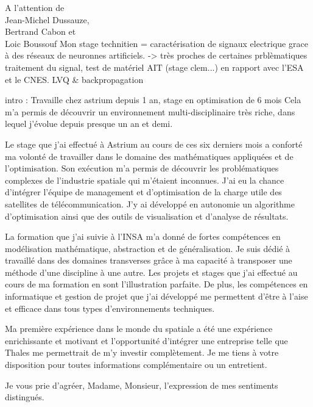 \documentclass[12pt]{lettre}
\begin{document}
\begin{letter}{A l'attention de\\Jean-Michel Dussauze,\\Bertrand Cabon et\\ Loic Boussouf}
Mon stage technitien = caractérisation de signaux electrique grace à des réseaux de neuronnes artificiels. -> très proches de certaines prblèmatiques traitement du signal, test de matériel AIT (stage clem...) en rapport avec l'ESA et le CNES. LVQ \& backpropagation


intro : Travaille chez astrium depuis 1 an, stage en optimisation de 6 mois
Cela m'a permis de découvrir un environnement multi-disciplinaire très riche, dans lequel j'évolue depuis presque un an et demi.


Le stage que j'ai effectué à Astrium au cours de ces six derniers mois a conforté ma volonté de travailler dans le domaine des mathématiques appliquées et de l'optimisation. Son exécution m'a permis de découvrir les problématiques complexes de l'industrie spatiale qui m'étaient inconnues. J'ai eu la chance d'intégrer l'équipe de management et d'optimisation de la charge utile des satellites de télécommunication. J'y ai développé en autonomie un algorithme d'optimisation ainsi que des outils de visualisation et d'analyse de résultats.

La formation que j'ai suivie à l'INSA m'a donné de fortes compétences en modélisation mathématique, abstraction et de généralisation. Je suis dédié à travaillé dans des domaines transverses grâce à ma capacité à transposer une méthode d'une discipline à une autre. Les projets et stages que j'ai effectué au cours de ma formation en sont l'illustration parfaite. De plus, les compétences en informatique et gestion de projet que j'ai développé me permettent d'être à l'aise et efficace dans tous types d'environnements techniques.%

Ma première expérience dans le monde du spatiale a été une expérience enrichissante et motivant et l'opportunité d'intégrer une entreprise  telle que Thales me permettrait de m'y investir complètement.
%
Je me tiens à votre disposition pour toutes informations complémentaire ou un entretient.
\closing{Je vous prie d'agréer, Madame, Monsieur, l'expression de mes sentiments distingués.}
\end{letter}
\end{document}
